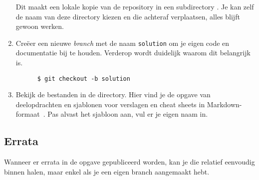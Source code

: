 \begin{enumerate}
  Dit maakt een lokale kopie van de repository in een subdirectory . Je kan zelf de naam van deze directory kiezen en die achteraf verplaatsen, alles blijft gewoon werken.
  
  \item Creëer een nieuwe \emph{branch} met de naam \texttt{solution} om je eigen code en documentatie bij te houden. Verderop wordt duidelijk waarom dit belangrijk is.

    \begin{verbatim}
      $ git checkout -b solution
    \end{verbatim}

  \item Bekijk de bestanden in de  directory. Hier vind je de opgave van deelopdrachten en sjablonen voor verslagen en cheat sheets in Markdown-formaat~\autocite{Gruber2004}. Pas alvast het sjabloon aan, vul er je eigen naam in.
\end{enumerate}

\subsection{Errata}

Wanneer er errata in de opgave gepubliceerd worden, kan je die relatief eenvoudig binnen halen, maar enkel als je een eigen branch aangemaakt hebt.

